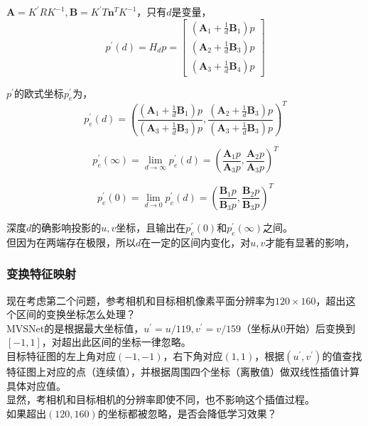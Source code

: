 	$\mathbf{A}=K^\prime R K^{-1},\mathbf{B}=K^{\prime}T\mathbf{n}^TK^{-1}$，只有$d$是变量，
	$$
		p^\prime(d) = H_d p = \begin{bmatrix}
			\left(\mathbf{A}_1 + \frac{1}{d}\mathbf{B}_1\right)p\\
			\left(\mathbf{A}_2 + \frac{1}{d}\mathbf{B}_3\right)p\\
			\left(\mathbf{A}_3 + \frac{1}{d}\mathbf{B}_4\right)p
		\end{bmatrix}
	$$

	$p^\prime$的欧式坐标$p^\prime_e$为，
	$$
		p^\prime_e(d) = \left(
			\frac{\left(\mathbf{A}_1 + \frac{1}{d}\mathbf{B}_1\right)p}{\left(\mathbf{A}_3 + \frac{1}{d}\mathbf{B}_3\right)p},
			\frac{\left(\mathbf{A}_2 + \frac{1}{d}\mathbf{B}_3\right)p}{\left(\mathbf{A}_3 + \frac{1}{d}\mathbf{B}_3\right)p}
		\right)^T
	$$

	$$
		p^\prime_e(\infty) = \lim_{d\rightarrow \infty}p^\prime_e(d) = \left(
			\frac{\mathbf{A}_1p}{\mathbf{A}_3p},
			\frac{\mathbf{A}_2p}{\mathbf{A}_3p}
		\right)^T
	$$

	$$
		p^\prime_e(0) = \lim_{d\rightarrow 0}p^\prime_e(d) = \left(
			\frac{\mathbf{B}_1p}{\mathbf{B}_3p},
			\frac{\mathbf{B}_2p}{\mathbf{B}_3p}
		\right)^T
	$$	

	深度$d$的确影响投影的$u,v$坐标，且输出在$p^\prime_e(0)$和$p^\prime_e(\infty)$之间。\\

	但因为在两端存在极限，所以$d$在一定的区间内变化，对$u,v$才能有显著的影响，
	
	\subsubsection*{变换特征映射}
		现在考虑第二个问题，参考相机和目标相机像素平面分辨率为$120 \times 160$，超出这个区间的变换坐标怎么处理？\\

		MVSNet的是根据最大坐标值，$u^\prime = u/119, v^\prime = v/159$（坐标从0开始）后变换到$[-1,1]$，对超出此区间的坐标一律忽略。\\

		目标特征图的左上角对应$(-1,-1)$，右下角对应$(1,1)$，根据$(u^\prime, v^\prime)$的值查找特征图上对应的点（连续值），并根据周围四个坐标（离散值）做双线性插值计算具体对应值。\\

		显然，考相机和目标相机的分辨率即使不同，也不影响这个插值过程。\\

		如果超出$(120,160)$的坐标都被忽略，是否会降低学习效果？\\

